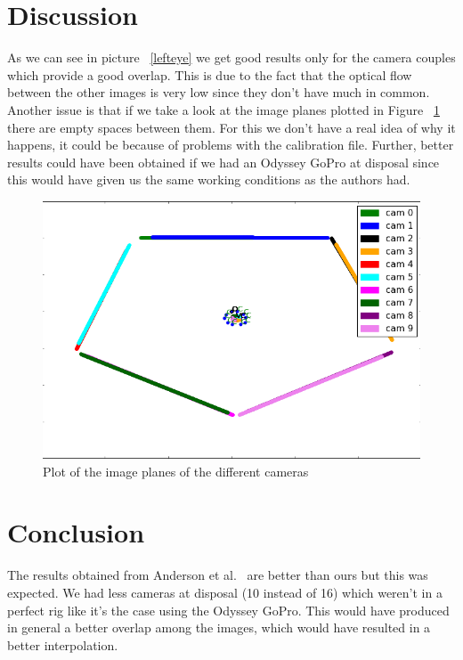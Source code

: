 \documentclass[10pt,twocolumn,letterpaper]{article}
\begin{document}
\section{Discussion}
\label{discussion}
As we can see in picture ~\ref{lefteye} we get good results only for the camera couples which provide a good overlap. This is due to the fact that the optical flow between the other images is very low since they don't have much in common. Another issue is that if we take a look at the image planes plotted in Figure ~\ref{imageplanes} there are empty spaces between them. For this we don't have a real idea of why it happens, it could be because of problems with the calibration file.
Further, better results could have been obtained if we had an Odyssey GoPro at disposal since this would have given us the same working conditions as the authors had.
\begin{figure}[t]
\begin{center}
   \includegraphics[width=0.7\linewidth]{pictures/rig_detailed.png}
\end{center}
   \caption{Plot of the image planes of the different cameras}
\label{imageplanes}
\end{figure}
\section{Conclusion}
\label{conclusion}
The results obtained from Anderson et al.~\cite{jump16} are better than ours but this was expected. We had less cameras at disposal (10 instead of 16) which weren't in a perfect rig like it's the case using the Odyssey GoPro. This would have produced in general a better overlap among the images, which would have resulted in a better interpolation.

{\small


}
\end{document}
